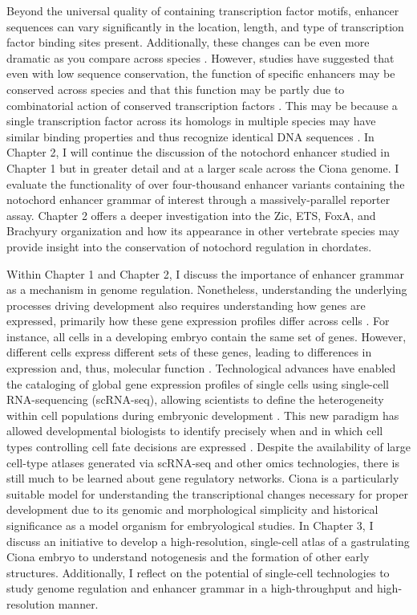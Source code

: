 \begin{dissertationintroduction}
    Beyond the universal quality of containing transcription factor motifs, enhancer sequences can vary significantly in the location, length, and type of transcription factor binding sites present. Additionally, these changes can be even more dramatic as you compare across species \cite{villar2015, ward2012, wong2020}. However, studies have suggested that even with low sequence conservation, the function of specific enhancers may be conserved across species and that this function may be partly due to combinatorial action of conserved transcription factors \cite{claussnitzer2014, wong2020}. This may be because a single transcription factor across its homologs in multiple species may have similar binding properties and thus recognize identical DNA sequences \cite{peter2011, wong2020}. In Chapter 2, I will continue the discussion of the notochord enhancer studied in Chapter 1 but in greater detail and at a larger scale across the Ciona genome. I evaluate the functionality of over four-thousand enhancer variants containing the notochord enhancer grammar of interest through a massively-parallel reporter assay. Chapter 2 offers a deeper investigation into the Zic, ETS, FoxA, and Brachyury organization and how its appearance in other vertebrate species may provide insight into the conservation of notochord regulation in chordates.

    Within Chapter 1 and Chapter 2, I discuss the importance of enhancer grammar as a mechanism in genome regulation. Nonetheless, understanding the underlying processes driving development also requires understanding how genes are expressed, primarily how these gene expression profiles differ across cells \cite{peter2011}. For instance, all cells in a developing embryo contain the same set of genes. However, different cells express different sets of these genes, leading to differences in expression and, thus, molecular function \cite{arnone1997, peter2011}. Technological advances have enabled the cataloging of global gene expression profiles of single cells using single-cell RNA-sequencing (scRNA-seq), allowing scientists to define the heterogeneity within cell populations during embryonic development \cite{klein2015a, macosko2015, olsen2018}. This new paradigm has allowed developmental biologists to identify precisely when and in which cell types controlling cell fate decisions are expressed \cite{klein2019}. Despite the availability of large cell-type atlases generated via scRNA-seq and other omics technologies, there is still much to be learned about gene regulatory networks. Ciona is a particularly suitable model for understanding the transcriptional changes necessary for proper development due to its genomic and morphological simplicity and historical significance as a model organism for embryological studies. In Chapter 3, I discuss an initiative to develop a high-resolution, single-cell atlas of a gastrulating Ciona embryo to understand notogenesis and the formation of other early structures. Additionally, I reflect on the potential of single-cell technologies to study genome regulation and enhancer grammar in a high-throughput and high-resolution manner. 
    

\end{dissertationintroduction}
